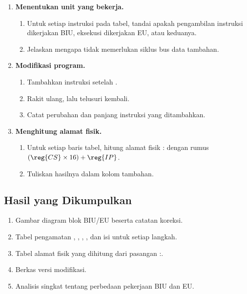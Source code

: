\begin{enumerate}
    \item \textbf{Menentukan unit yang bekerja.}
    \begin{enumerate}
        \item Untuk setiap instruksi pada tabel, tandai apakah
              pengambilan instruksi dikerjakan BIU, eksekusi
              dikerjakan EU, atau keduanya.
        \item Jelaskan mengapa  tidak memerlukan
              siklus bus data tambahan.
    \end{enumerate}

    \item \textbf{Modifikasi program.}
    \begin{enumerate}
        \item Tambahkan instruksi  setelah
              .
        \item Rakit ulang, lalu telusuri kembali.
        \item Catat perubahan  dan panjang instruksi yang
              ditambahkan.
    \end{enumerate}

    \item \textbf{Menghitung alamat fisik.}
    \begin{enumerate}
        \item Untuk setiap baris tabel, hitung alamat fisik
              : dengan rumus
              $(\reg{CS} \times 16) + \reg{IP}$.
        \item Tuliskan hasilnya dalam kolom tambahan.
    \end{enumerate}
\end{enumerate}

\subsection{Hasil yang Dikumpulkan}

\begin{enumerate}
    \item Gambar diagram blok BIU/EU beserta catatan koreksi.
    \item Tabel pengamatan , , , ,
          dan isi  untuk setiap langkah.
    \item Tabel alamat fisik yang dihitung dari pasangan
          :.
    \item Berkas  versi modifikasi.
    \item Analisis singkat tentang perbedaan pekerjaan BIU dan EU.
\end{enumerate}

